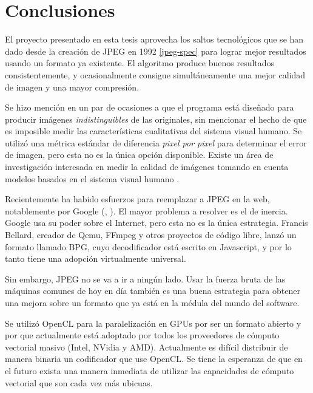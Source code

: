 
\chapter{Conclusiones}\label{ch:conclusiones}

El proyecto presentado en esta tesis aprovecha los saltos tecnológicos que se
han dado desde la creación de JPEG en 1992 \ref{jpeg-spec} para lograr mejor
resultados usando un formato ya existente. El algoritmo produce buenos
resultados consistentemente, y ocasionalmente consigue simultáneamente una
mejor calidad de imagen y una mayor compresión.

Se hizo mención en un par de ocasiones a que el programa está diseñado para
producir imágenes \emph{indistinguibles} de las originales, sin mencionar el
hecho de que es imposible medir las características cualitativas del sistema
visual humano. Se utilizó una métrica estándar de diferencia \emph{pixel por
pixel} para determinar el error de imagen, pero esta no es la única opción
disponible. Existe un área de investigación interesada en medir la calidad de
imágenes tomando en cuenta modelos basados en el sistema visual humano
\cite{subjective-paper}.

Recientemente ha habido esfuerzos para reemplazar a JPEG en la web,
notablemente por Google (\cite{brotli}, \cite{webp}). El mayor problema a
resolver es el de inercia. Google usa su poder sobre el Internet, pero esta no
es la única estrategia. Francis Bellard, creador de Qemu, FFmpeg y otros
proyectos de código libre, lanzó un formato llamado \gls{BPG}, cuyo
decodificador está escrito en Javascript, y por lo tanto tiene una adopción
virtualmente universal.

Sin embargo, JPEG no se va a ir a ningún lado. Usar la fuerza bruta de las
máquinas comunes de hoy en día también es una buena estrategia para obtener una
mejora sobre un formato que ya está en la médula del mundo del software.

Se utilizó OpenCL para la paralelización en GPUs por ser un formato abierto y
por que actualmente está adoptado por todos los proveedores de cómputo
vectorial masivo (Intel, NVidia y AMD). Actualmente es difícil distribuir de
manera binaria un codificador que use OpenCL. Se tiene la esperanza de que en
el futuro exista una manera inmediata de utilizar las capacidades de cómputo
vectorial que son cada vez más ubicuas.

